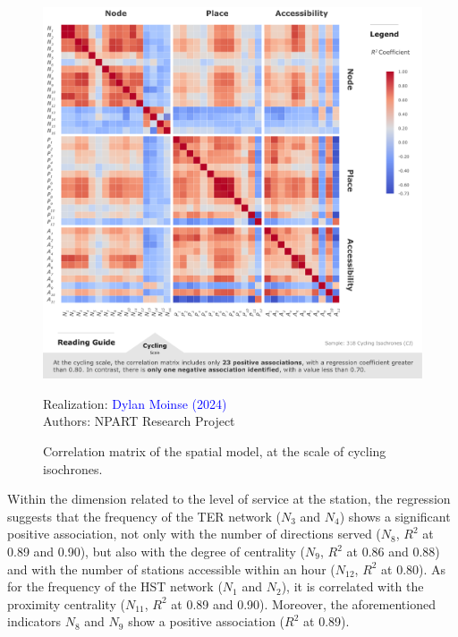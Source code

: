\begin{refsegment}
\begin{figure}[h!]\vspace*{4pt}
    \caption{Correlation matrix of the spatial model, at the scale of cycling isochrones.}
    \label{fig-chap6:correlations-indicateurs-independants-CI}
    \centerline{\includegraphics[width=1\columnwidth]{src/Figures/Chap-6/EN_NPART_Matrice_Correlation_CI.pdf}}
    \vspace{5pt}
    \begin{flushright}\scriptsize{
    Realization: \textcolor{blue}{Dylan Moinse (2024)}
    \\
    Authors: \acrshort{NPART} Research Project
    }\end{flushright}
\end{figure}

Within the dimension related to the level of service at the station, the regression suggests that the frequency of the \acrshort{TER} network (\(N_{3}\) and \(N_{4}\)) shows a significant positive association, not only with the number of directions served (\(N_{8}\), \(R^{2}\) at 0.89 and 0.90), but also with the degree of centrality (\(N_{9}\), \(R^{2}\) at 0.86 and 0.88) and with the number of stations accessible within an hour (\(N_{12}\), \(R^{2}\) at 0.80). As for the frequency of the \acrshort{HST} network (\(N_{1}\) and \(N_{2}\)), it is correlated with the proximity centrality (\(N_{11}\), \(R^{2}\) at 0.89 and 0.90). Moreover, the aforementioned indicators \(N_{8}\) and \(N_{9}\) show a positive association (\(R^{2}\) at 0.89).%


\end{refsegment}
